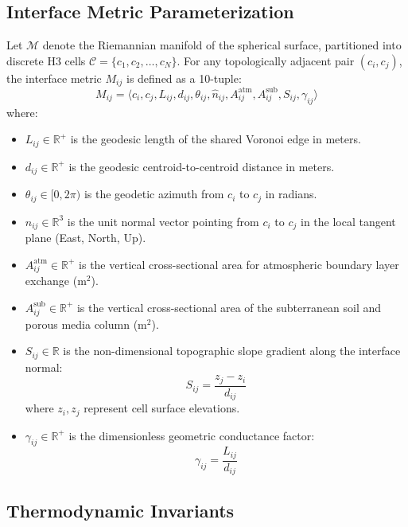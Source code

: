 \documentclass[10pt,journal,compsoc]{IEEEtran}
\begin{document}
\subsection{Interface Metric Parameterization}
Let $\mathcal{M}$ denote the Riemannian manifold of the spherical surface, partitioned into discrete H3 cells $\mathcal{C} = \{c_1, c_2, \dots, c_N\}$. For any topologically adjacent pair $(c_i, c_j)$, the interface metric $M_{ij}$ is defined as a 10-tuple:
\begin{equation}
M_{ij} = \langle c_i, c_j, L_{ij}, d_{ij}, \theta_{ij}, \hat{n}_{ij}, A_{ij}^{\text{atm}}, A_{ij}^{\text{sub}}, S_{ij}, \gamma_{ij} \rangle
\end{equation}
where:
\begin{itemize}
    \item $L_{ij} \in \mathbb{R}^+$ is the geodesic length of the shared Voronoi edge in meters.
    \item $d_{ij} \in \mathbb{R}^+$ is the geodesic centroid-to-centroid distance in meters.
    \item $\theta_{ij} \in [0, 2\pi)$ is the geodetic azimuth from $c_i$ to $c_j$ in radians.
    \item $\hat{n}_{ij} \in \mathbb{R}^3$ is the unit normal vector pointing from $c_i$ to $c_j$ in the local tangent plane (East, North, Up).
    \item $A_{ij}^{\text{atm}} \in \mathbb{R}^+$ is the vertical cross-sectional area for atmospheric boundary layer exchange ($\text{m}^2$).
    \item $A_{ij}^{\text{sub}} \in \mathbb{R}^+$ is the vertical cross-sectional area of the subterranean soil and porous media column ($\text{m}^2$).
    \item $S_{ij} \in \mathbb{R}$ is the non-dimensional topographic slope gradient along the interface normal:
    \begin{equation}
    S_{ij} = \frac{z_j - z_i}{d_{ij}}
    \end{equation}
    where $z_i, z_j$ represent cell surface elevations.
    \item $\gamma_{ij} \in \mathbb{R}^+$ is the dimensionless geometric conductance factor:
    \begin{equation}
    \gamma_{ij} = \frac{L_{ij}}{d_{ij}}
    \end{equation}
\end{itemize}

\subsection{Thermodynamic Invariants}
\end{document}
